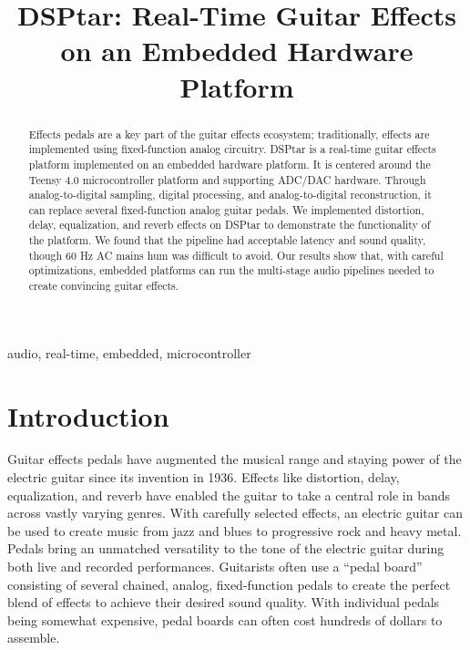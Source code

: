 \documentclass[conference]{IEEEtran}
\begin{document}
\title{DSPtar: Real-Time Guitar Effects on an Embedded Hardware Platform}

\author{
}
\maketitle

\begin{abstract}
Effects pedals are a key part of the guitar effects ecosystem; traditionally, effects are implemented using fixed-function analog circuitry. DSPtar is a real-time guitar effects platform implemented on an embedded hardware platform. It is centered around the Teensy 4.0 microcontroller platform and supporting ADC/DAC hardware. Through analog-to-digital sampling, digital processing, and analog-to-digital reconstruction, it can replace several fixed-function analog guitar pedals. We implemented distortion, delay, equalization, and reverb effects on DSPtar to demonstrate the functionality of the platform. We found that the pipeline had acceptable latency and sound quality, though 60 Hz AC mains hum was difficult to avoid. Our results show that, with careful optimizations, embedded platforms can run the multi-stage audio pipelines needed to create convincing guitar effects.
\end{abstract}

\begin{IEEEkeywords}
audio, real-time, embedded, microcontroller
\end{IEEEkeywords}

\section{Introduction}
Guitar effects pedals have augmented the musical range and staying power of the electric guitar since its invention in 1936. Effects like distortion, delay, equalization, and reverb have enabled the guitar to take a central role in bands across vastly varying genres. With carefully selected effects, an electric guitar can be used to create music from jazz and blues to progressive rock and heavy metal. Pedals bring an unmatched versatility to the tone of the electric guitar during both live and recorded performances. Guitarists often use a ``pedal board'' consisting of several chained, analog, fixed-function pedals to create the perfect blend of effects to achieve their desired sound quality. With individual pedals being somewhat expensive, pedal boards can often cost hundreds of dollars to assemble. 
\end{document}
